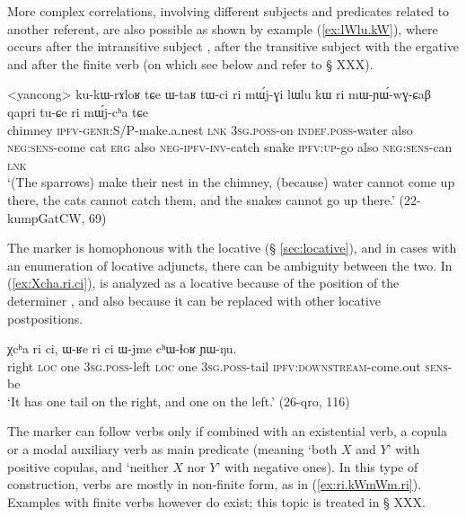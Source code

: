  More complex correlations, involving different subjects and predicates related to another referent, are also possible as shown by example (\ref{ex:lWlu.kW}), where  occurs after the intransitive subject , after the transitive subject  with the ergative and after the finite verb  (on which see below and refer to § XXX).
 
 \begin{exe}
\ex   \label{ex:lWlu.kW}
\gll <yancong> ku-kɯ-rɤloʁ tɕe ɯ-taʁ tɯ-ci ri mɯ́j-ɣi lɯlu kɯ ri mɯ-ɲɯ́-wɣ-ɕaβ qapri tu-ɕe ri mɯ́j-cʰa tɕe \\
 chimney \textsc{ipfv}-\textsc{genr}:S/P-make.a.nest \textsc{lnk} \textsc{3sg}.\textsc{poss}-on \textsc{indef}.\textsc{poss}-water also \textsc{neg}:\textsc{sens}-come cat \textsc{erg} also \textsc{neg}-\textsc{ipfv}-\textsc{inv}-catch snake \textsc{ipfv}:\textsc{up}-go also \textsc{neg}:\textsc{sens}-can \textsc{lnk} \\
 \glt `(The sparrows) make their nest in the chimney, (because) water cannot come up there, the cats cannot catch them, and the snakes cannot go up there.' (22-kumpGatCW, 69)
 \end{exe}
 
 The marker  is homophonous with the locative  (§ \ref{sec:locative}), and in cases with an enumeration of locative adjuncts, there can be ambiguity between the two. In (\ref{ex:Xcha.ri.ci}),  is analyzed as a locative because of the position of the determiner , and also because it can be replaced with other locative postpositions.
 
 \begin{exe}
\ex \label{ex:Xcha.ri.ci}
\gll   χcʰa ri ci, ɯ-ʁe ri ci ɯ-jme cʰɯ-ɬoʁ ɲɯ-ŋu. \\
right \textsc{loc} one  \textsc{3sg}.\textsc{poss}-left \textsc{loc} one \textsc{3sg}.\textsc{poss}-tail \textsc{ipfv}:\textsc{downstream}-come.out \textsc{sens}-be \\
\glt `It has one tail on the right, and one on the left.' (26-qro, 116)
\end{exe}

The marker  can follow verbs only if combined with an existential verb, a copula or a modal auxiliary verb as main predicate (meaning `both $X$ and $Y$' with positive copulas, and `neither $X$ nor $Y$' with negative ones). In this type of construction, verbs are mostly in non-finite form, as in (\ref{ex:ri.kWmWm.ri}). Examples with finite verbs however do exist; this topic is treated in § XXX. %


